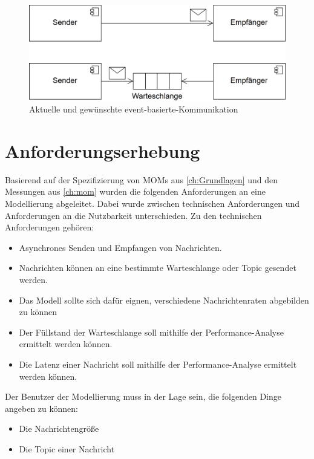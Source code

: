 \begin{figure}
\center
  \includegraphics[width=1\textwidth]{images/modelling/oldEventBased.png}
  \caption{Aktuelle und gewünschte event-basierte-Kommunikation}
  \label{img:oldEventBased}
\end{figure}


\section{Anforderungserhebung}
\label{sec:anforderungserhebung}
Basierend auf der Spezifizierung von MOMs aus \autoref{ch:Grundlagen} und den Messungen aus \autoref{ch:mom} wurden die folgenden Anforderungen an eine Modellierung abgeleitet. Dabei wurde zwischen technischen Anforderungen und Anforderungen an die Nutzbarkeit unterschieden. 
Zu den technischen Anforderungen gehören:
\begin{itemize}
    \item Asynchrones Senden und Empfangen von Nachrichten.
    \item Nachrichten können an eine bestimmte Warteschlange oder Topic gesendet werden.
    \item Das Modell sollte sich dafür eignen, verschiedene Nachrichtenraten abgebilden zu können
    \item Der Füllstand der Warteschlange soll mithilfe der Performance-Analyse ermittelt werden können.
    \item Die Latenz einer Nachricht soll mithilfe der Performance-Analyse ermittelt werden können.
\end{itemize}
Der Benutzer der Modellierung muss in der Lage sein, die folgenden Dinge angeben zu können:
\begin{itemize}
    \item Die Nachrichtengröße
    \item Die Topic einer Nachricht
\end{itemize}

